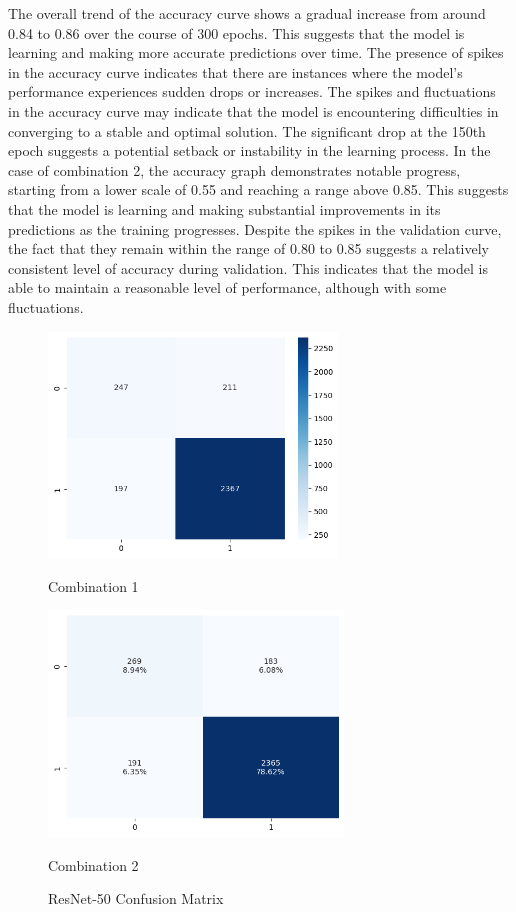The overall trend of the accuracy curve shows a gradual increase from around 0.84 to 0.86 over the course of 300 epochs. This suggests that the model is learning and making more accurate predictions over time. The presence of spikes in the accuracy curve indicates that there are instances where the model's performance experiences sudden drops or increases. The spikes and fluctuations in the accuracy curve may indicate that the model is encountering difficulties in converging to a stable and optimal solution. The significant drop at the 150th epoch suggests a potential setback or instability in the learning process. In the case of combination 2, the accuracy graph demonstrates notable progress, starting from a lower scale of 0.55 and reaching a range above 0.85. This suggests that the model is learning and making substantial improvements in its predictions as the training progresses. Despite the spikes in the validation curve, the fact that they remain within the range of 0.80 to 0.85 suggests a relatively consistent level of accuracy during validation. This indicates that the model is able to maintain a reasonable level of performance, although with some fluctuations.


\begin{figure}[H]
    \centering
    \begin{minipage}[b]{0.49\textwidth}
        \centering
        \includegraphics[width=\textwidth, height=6cm]{Figures/unbalanced_data/without bn/resnet/cm.png}
        \captionsetup{labelformat=empty}
        \caption{Combination 1}
        \label{fig:u_wo_r_cm}
    \end{minipage}
    \hfill
    \begin{minipage}[b]{0.49\textwidth}
        \centering
        \includegraphics[width=\textwidth, height=6cm]{Figures/unbalanced_data/with bn/resnet/cm.png}
        \captionsetup{labelformat=empty}
        \caption{Combination 2}
        \label{fig:u_w_r_cm}
    \end{minipage}
    \captionsetup{labelformat=default}
    \caption{ResNet-50 Confusion Matrix}
\end{figure}

